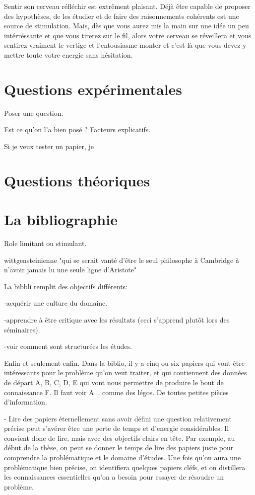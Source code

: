 \documentclass[24pt]{article}
\begin{document}
Sentir son cerveau réfléchir est extrêment plaisant. Déjà être capable de proposer des hypothèses, de les étudier et de faire des raisonnements cohérents est une source de stimulation. Mais, dès que vous aurez mis la main sur une idée un peu intérréssante et que vous tirerez sur le fil, alors votre cerveau se réveillera et vous sentirez vraiment le vertige et l'entousiasme monter et c'est là que vous devez y mettre toute votre energie  sans hésitation. 


\section{Questions expérimentales}

Poser une question. 

Est ce qu'on l'a bien posé ? 
Facteurs explicatifs.

Si je veux tester un papier, je 





\section{Questions théoriques}



\section{La bibliographie}
  
Role limitant ou stimulant. 


wittgensteinienne  "qui se serait vanté d’être le seul philosophe à Cambridge à n’avoir jamais lu une seule ligne d’Aristote"


La bibbli remplit des objectifs différents: 

-acquérir une culture du domaine. 

-apprendre à être critique avec les résultats (ceci s'apprend plutôt lors des séminaires). 

-voir comment sont structurées les études.


Enfin et seulement enfin. Dans la biblio, il y a cinq ou six papiers qui vont être intéressants pour le problème qu'on veut traiter, et qui contiennent des données de départ A, B, C, D, E qui vont nous permettre de produire le bout de connaissance F. Il faut voir A... comme des légos. De toutes petites pièces d'information. 


- Lire des papiers éternellement sans avoir défini une question relativement précise peut s'avérer être une perte de temps et d'energie considérables. Il convient donc de lire, mais avec des objectifs clairs en tête. Par exemple, au début de la thèse, on peut se donner le temps de lire des papiers juste pour comprendre la problématique et le domaine d'études. Une fois qu'on aura une problématique bien précise, on identifiera quelques papiers cléfs, et on distillera les connaissances essentielles qu'on a besoin pour essayer de résoudre un problème. 
\end{document}
